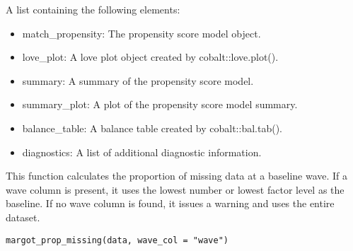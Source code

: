 \documentclass[a4paper]{book}
\begin{document}
%
\begin{Value}
A list containing the following elements:
\begin{itemize}

\item{} match\_propensity: The propensity score model object.
\item{} love\_plot: A love plot object created by cobalt::love.plot().
\item{} summary: A summary of the propensity score model.
\item{} summary\_plot: A plot of the propensity score model summary.
\item{} balance\_table: A balance table created by cobalt::bal.tab().
\item{} diagnostics: A list of additional diagnostic information.

\end{itemize}

\end{Value}
%
\begin{Examples}
\end{Examples}
%
\begin{Description}
This function calculates the proportion of missing data at a baseline wave.
If a wave column is present, it uses the lowest number or lowest factor level as the baseline.
If no wave column is found, it issues a warning and uses the entire dataset.
\end{Description}
%
\begin{Usage}
\begin{verbatim}
margot_prop_missing(data, wave_col = "wave")
\end{verbatim}
\end{Usage}
\end{document}

